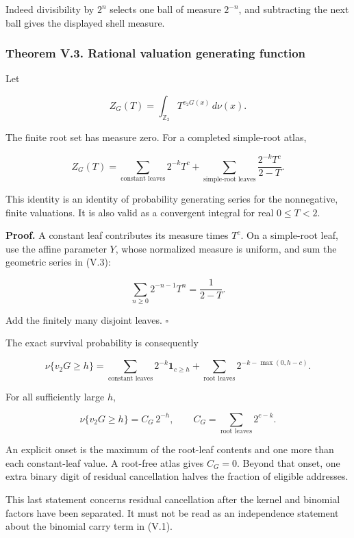 \documentclass[11pt,letterpaper]{article}
\begin{document}
Indeed divisibility by \(2^n\) selects one ball of measure \(2^{-n}\), and subtracting the next ball gives the displayed shell measure.

\subsubsection{Theorem V.3. Rational valuation generating function}\label{theorem-v.3.-rational-valuation-generating-function}

Let

\[
Z_G(T)=\int_{\mathbb Z_2}T^{v_2G(x)}\,d\nu(x).
\]

The finite root set has measure zero. For a completed simple-root atlas,

\[
\boxed{
 Z_G(T)=
 \sum_{\text{constant leaves}}2^{-k}T^c
 +\sum_{\text{simple-root leaves}}
 \frac{2^{-k}T^c}{2-T}.
} \tag{V.4}
\]

This identity is an identity of probability generating series for the nonnegative, finite valuations. It is also valid as a convergent integral for real \(0\le T<2\).

\textbf{Proof.} A constant leaf contributes its measure times \(T^c\). On a simple-root leaf, use the affine parameter \(Y\), whose normalized measure is uniform, and sum the geometric series in (V.3):

\[
\sum_{n\ge0}2^{-n-1}T^n=\frac1{2-T}.
\]

Add the finitely many disjoint leaves. \(\square\)

The exact survival probability is consequently

\[
\boxed{
\nu\{v_2G\ge h\}=
\sum_{\text{constant leaves}}2^{-k}\mathbf1_{c\ge h}
+\sum_{\text{root leaves}}2^{-k-\max(0,h-c)}.
} \tag{V.5}
\]

For all sufficiently large \(h\),

\[
\boxed{
\nu\{v_2G\ge h\}=C_G\,2^{-h},
\qquad C_G=\sum_{\text{root leaves}}2^{c-k}.
} \tag{V.6}
\]

An explicit onset is the maximum of the root-leaf contents and one more than each constant-leaf value. A root-free atlas gives \(C_G=0\). Beyond that onset, one extra binary digit of residual cancellation halves the fraction of eligible addresses.

This last statement concerns residual cancellation after the kernel and binomial factors have been separated. It must not be read as an independence statement about the binomial carry term in (V.1).

\end{document}
